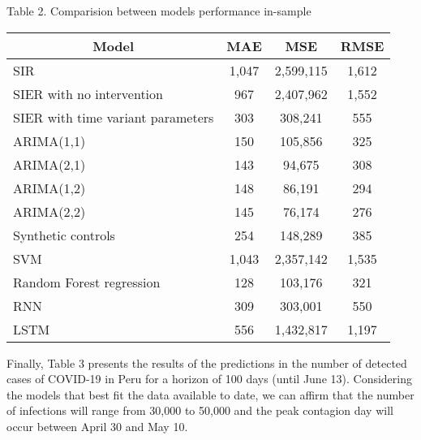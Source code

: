 \documentclass[12pt]{article}
\begin{document}
\begin{flushleft}
\centering Table 2. Comparision between models performance in-sample \end{flushleft}
\begin{table}[h!]
\centering
\begin{tabular}{ | p{7cm} | p{2cm} | p{2cm} | p{2cm} | }
\hline
\multicolumn{1}{|c|}{Model} & \multicolumn{1}{|c|}{MAE} & \multicolumn{1}{|c|}{MSE} & \multicolumn{1}{|c|}{RMSE} \\ [0.5ex] 
\hline\hline
SIR & \multicolumn{1}{|c|}{1,047}  & \multicolumn{1}{|c|}{2,599,115} & \multicolumn{1}{|c|}{1,612} \\
SIER with no intervention & \multicolumn{1}{|c|}{967} & \multicolumn{1}{|c|}{2,407,962} & \multicolumn{1}{|c|}{1,552} \\
SIER with time variant parameters & \multicolumn{1}{|c|}{303} & \multicolumn{1}{|c|}{308,241} & \multicolumn{1}{|c|}{555} \\
ARIMA(1,1) & \multicolumn{1}{|c|}{150} & \multicolumn{1}{|c|}{105,856} & \multicolumn{1}{|c|}{325} \\
ARIMA(2,1) & \multicolumn{1}{|c|}{143} & \multicolumn{1}{|c|}{94,675} & \multicolumn{1}{|c|}{308} \\
ARIMA(1,2) & \multicolumn{1}{|c|}{148} & \multicolumn{1}{|c|}{86,191} & \multicolumn{1}{|c|}{294} \\
ARIMA(2,2) & \multicolumn{1}{|c|}{145} & \multicolumn{1}{|c|}{76,174} & \multicolumn{1}{|c|}{276} \\
Synthetic controls & \multicolumn{1}{|c|}{254} & \multicolumn{1}{|c|}{148,289} & \multicolumn{1}{|c|}{385} \\
SVM & \multicolumn{1}{|c|}{1,043} & \multicolumn{1}{|c|}{2,357,142} & \multicolumn{1}{|c|}{1,535} \\
Random Forest regression & \multicolumn{1}{|c|}{128} & \multicolumn{1}{|c|}{103,176} & \multicolumn{1}{|c|}{321} \\
RNN & \multicolumn{1}{|c|}{309} & \multicolumn{1}{|c|}{303,001} & \multicolumn{1}{|c|}{550} \\
LSTM & \multicolumn{1}{|c|}{556} & \multicolumn{1}{|c|}{1,432,817} & \multicolumn{1}{|c|}{1,197} \\
\hline
\end{tabular}
\end{table}

Finally, Table 3 presents the results of the predictions in the number of detected cases of COVID-19 in Peru for a horizon of 100 days (until June 13). Considering the models that best fit the data available to date, we can affirm that the number of infections will range from 30,000 to 50,000 and the peak contagion day will occur between April 30 and May 10.
\clearpage
\end{document}
